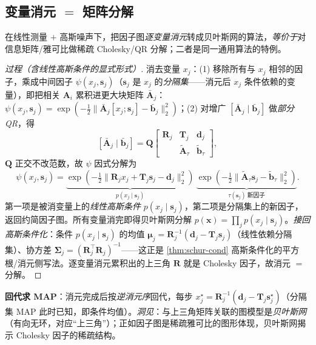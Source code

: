 \subsection{变量消元 $=$ 矩阵分解}
\label{sec:est-elimination}

\begin{theorem}[变量消元 $=$ 稀疏矩阵分解]\label{thm:elimination}
在线性测量 $+$ 高斯噪声下，把因子图\emph{逐变量消元}转成贝叶斯网的算法，\emph{等价于}对信息矩阵/雅可比做稀疏 Cholesky/QR 分解；二者是同一通用算法的特例。
\end{theorem}
\begin{proof}[过程（含线性高斯条件的显式形式）]
消去变量 $x_j$：(1) 移除所有与 $x_j$ 相邻的因子，乘成中间因子 $\psi(x_j,\mathbf{s}_j)$（$\mathbf{s}_j$ 是 $x_j$ 的\emph{分隔集}——消元后 $x_j$ 条件依赖的变量），即把相关 $\mathbf{A}_i$ 累积进更大块矩阵 $\bar{\mathbf{A}}_j$：$\psi(x_j,\mathbf{s}_j)=\exp(-\tfrac12\|\bar{\mathbf{A}}_j[x_j;\mathbf{s}_j]-\bar{\mathbf{b}}_j\|_2^2)$；(2) 对增广 $[\bar{\mathbf{A}}_j\mid\bar{\mathbf{b}}_j]$ 做\emph{部分 QR}，得
\[
  [\bar{\mathbf{A}}_j\mid\bar{\mathbf{b}}_j]=\mathbf{Q}\begin{bmatrix}\mathbf{R}_j&\mathbf{T}_j&\mathbf{d}_j\\&\tilde{\mathbf{A}}_\tau&\tilde{\mathbf{b}}_\tau\end{bmatrix},
\]
$\mathbf{Q}$ 正交不改范数，故 $\psi$ 因式分解为
\[
  \psi(x_j,\mathbf{s}_j)=\underbrace{\exp(-\tfrac12\|\mathbf{R}_j x_j+\mathbf{T}_j\mathbf{s}_j-\mathbf{d}_j\|_2^2)}_{p(x_j\mid\mathbf{s}_j)}\ \underbrace{\exp(-\tfrac12\|\tilde{\mathbf{A}}_\tau\mathbf{s}_j-\tilde{\mathbf{b}}_\tau\|_2^2)}_{\tau(\mathbf{s}_j)\ \text{新因子}}.
\]
第一项是被消变量上的\emph{线性高斯条件} $p(x_j\mid\mathbf{s}_j)$，第二项是分隔集上的新因子，返回约简因子图。所有变量消完即得贝叶斯网分解 $p(\mathbf{x})=\prod_j p(x_j\mid\mathbf{s}_j)$。\emph{接回高斯条件化}：条件 $p(x_j\mid\mathbf{s}_j)$ 的均值 $\boldsymbol{\mu}_j=\mathbf{R}_j^{-1}(\mathbf{d}_j-\mathbf{T}_j\mathbf{s}_j)$（线性依赖分隔集）、协方差 $\boldsymbol{\Sigma}_j=(\mathbf{R}_j^\top\mathbf{R}_j)^{-1}$——这正是 \cref{thm:schur-cond} 高斯条件化的平方根/消元侧写法。逐变量消元累积出的上三角 $\mathbf{R}$ 就是 Cholesky 因子，故消元 $=$ 分解。
\end{proof}
\noindent\textbf{回代求 MAP}：消元完成后按\emph{逆消元序}回代，每步 $x_j^\star=\mathbf{R}_j^{-1}(\mathbf{d}_j-\mathbf{T}_j\mathbf{s}_j^\star)$（分隔集 MAP 此时已知，即条件均值）。\emph{洞见}：与上三角矩阵关联的图模型是\emph{贝叶斯网}（有向无环，对应“上三角”）；正如因子图是稀疏雅可比的图形体现，贝叶斯网揭示 Cholesky 因子的稀疏结构。

